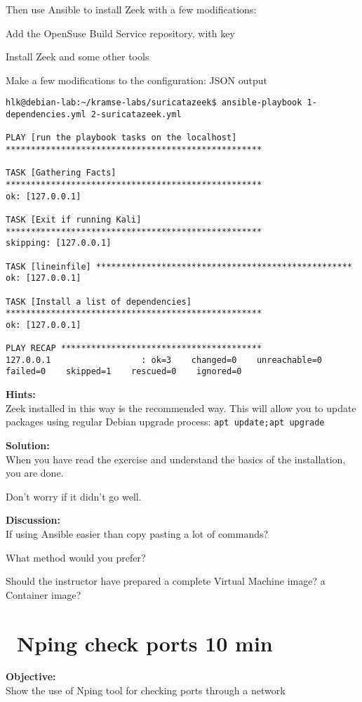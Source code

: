 \documentclass[a4paper,11pt,notitlepage]{report}
\begin{document}
Then use Ansible to install Zeek with a few modifications:

\begin{list2}
\item Add the OpenSuse Build Service repository, with key
\item Install Zeek and some other tools
\item Make a few modifications to the configuration: JSON output
\end{list2}

\begin{verbatim}
hlk@debian-lab:~/kramse-labs/suricatazeek$ ansible-playbook 1-dependencies.yml 2-suricatazeek.yml

PLAY [run the playbook tasks on the localhost] ***************************************************

TASK [Gathering Facts] ***************************************************
ok: [127.0.0.1]

TASK [Exit if running Kali] ***************************************************
skipping: [127.0.0.1]

TASK [lineinfile] ***************************************************
ok: [127.0.0.1]

TASK [Install a list of dependencies] ***************************************************
ok: [127.0.0.1]

PLAY RECAP ****************************************
127.0.0.1                  : ok=3    changed=0    unreachable=0    failed=0    skipped=1    rescued=0    ignored=0
\end{verbatim}


{\bf Hints:}\\
Zeek installed in this way is the recommended way. This will allow you to update packages using regular Debian upgrade process: \verb+apt update;apt upgrade+

{\bf Solution:}\\
When you have read the exercise and understand the basics of the installation, you are done.

Don't worry if it didn't go well.

{\bf Discussion:}\\
If using Ansible easier than copy pasting a lot of commands?

What method would you prefer?

Should the instructor have prepared a complete Virtual Machine image? a Container image?

\chapter{\faInfoCircle\ Nping check ports 10 min}
\label{ex:nping-tcp}
{\bf Objective:} \\
Show the use of Nping tool for checking ports through a network
\end{document}
